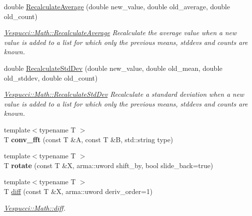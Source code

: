 \begin{DoxyCompactItemize}
\item 
double \hyperlink{namespace_vespucci_1_1_math_acb3549757968bb5b450a79ffce951cad}{Recalculate\+Average} (double new\+\_\+value, double old\+\_\+average, double old\+\_\+count)
\begin{DoxyCompactList}\small\item\em \hyperlink{namespace_vespucci_1_1_math_acb3549757968bb5b450a79ffce951cad}{Vespucci\+::\+Math\+::\+Recalculate\+Average} Recalculate the average value when a new value is added to a list for which only the previous means, stddevs and counts are known. \end{DoxyCompactList}\item 
double \hyperlink{namespace_vespucci_1_1_math_ab450596ed05ccd89c5183bd57ed1a0af}{Recalculate\+Std\+Dev} (double new\+\_\+value, double old\+\_\+mean, double old\+\_\+stddev, double old\+\_\+count)
\begin{DoxyCompactList}\small\item\em \hyperlink{namespace_vespucci_1_1_math_ab450596ed05ccd89c5183bd57ed1a0af}{Vespucci\+::\+Math\+::\+Recalculate\+Std\+Dev} Recalculate a standard deviation when a new value is added to a list for which only the previous means, stddevs and counts are known. \end{DoxyCompactList}\item 
\hypertarget{namespace_vespucci_1_1_math_a9c2b0dceba939de8417c1aa0382f9265}{{\footnotesize template$<$typename T $>$ }\\T {\bfseries conv\+\_\+fft} (const T \&A, const T \&B, std\+::string type)}\label{namespace_vespucci_1_1_math_a9c2b0dceba939de8417c1aa0382f9265}

\item 
\hypertarget{namespace_vespucci_1_1_math_a7928f8156c95fd307e7af5fef42bd2d0}{{\footnotesize template$<$typename T $>$ }\\T {\bfseries rotate} (const T \&X, arma\+::uword shift\+\_\+by, bool slide\+\_\+back=true)}\label{namespace_vespucci_1_1_math_a7928f8156c95fd307e7af5fef42bd2d0}

\item 
{\footnotesize template$<$typename T $>$ }\\T \hyperlink{namespace_vespucci_1_1_math_a9b57c78d676716cd14f45f1ed4cf066e}{diff} (const T \&X, arma\+::uword deriv\+\_\+order=1)
\begin{DoxyCompactList}\small\item\em \hyperlink{namespace_vespucci_1_1_math_a9b57c78d676716cd14f45f1ed4cf066e}{Vespucci\+::\+Math\+::diff}. \end{DoxyCompactList}\end{DoxyCompactItemize}


